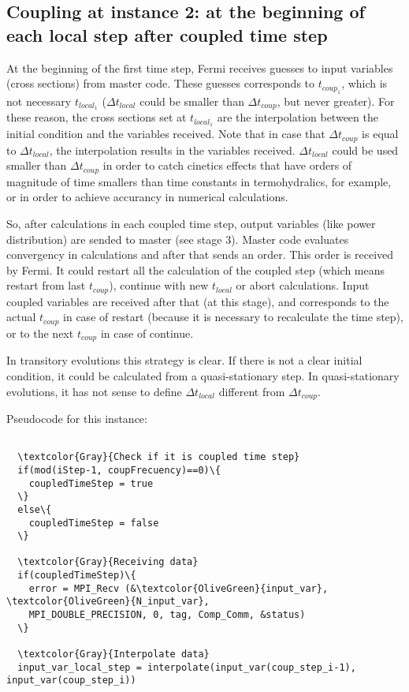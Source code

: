 \subsection*{Coupling at instance 2: at the beginning of each local step after coupled time step}

At the beginning of the first time step, Fermi receives guesses to input variables (cross sections) from master code.
These guesses corresponds to $t_{coup_1}$, which is not necessary $t_{local_1}$ 
($\Delta t_{local}$ could be smaller than $\Delta t_{coup}$, but never greater).
For these reason, the cross sections set at $t_{local_1}$ are the interpolation between the initial condition and the variables received.
Note that in case that $\Delta t_{coup}$ is equal to $\Delta t_{local}$, the interpolation results in the variables received.
$\Delta t_{local}$ could be used smaller than $\Delta t_{coup}$ 
in order to catch cinetics effects that have orders of magnitude of time smallers than time constants in termohydralics, for example,
or in order to achieve accurancy in numerical calculations.

So, after calculations in each coupled time step, output variables (like power distribution) are sended to master (see stage 3).
Master code evaluates convergency in calculations and after that sends an order.
This order is received by Fermi.
It could restart all the calculation of the coupled step (which means restart from last $t_{coup}$), 
continue with new $t_{local}$ or abort calculations.
Input coupled variables are received after that (at this stage), 
and corresponds to the actual $t_{coup}$ in case of restart (because it is necessary to recalculate the time step),
or to the next $t_{coup}$ in case of continue.

In transitory evolutions this strategy is clear.
If there is not a clear initial condition, it could be calculated from a quasi-stationary step.
In quasi-stationary evolutions, it has not sense to define $\Delta t_{local}$ different from $\Delta t_{coup}$.

Pseudocode for this instance:

\begin{Verbatim}[frame=single,commandchars=\\\{\}]

  \textcolor{Gray}{Check if it is coupled time step}
  if(mod(iStep-1, coupFrecuency)==0)\{
    coupledTimeStep = true
  \}
  else\{
    coupledTimeStep = false
  \}

  \textcolor{Gray}{Receiving data}
  if(coupledTimeStep)\{
    error = MPI_Recv (&\textcolor{OliveGreen}{input_var}, \textcolor{OliveGreen}{N_input_var},
    MPI_DOUBLE_PRECISION, 0, tag, Comp_Comm, &status)
  \}
  
  \textcolor{Gray}{Interpolate data}
  input_var_local_step = interpolate(input_var(coup_step_i-1), input_var(coup_step_i))

\end{Verbatim}


